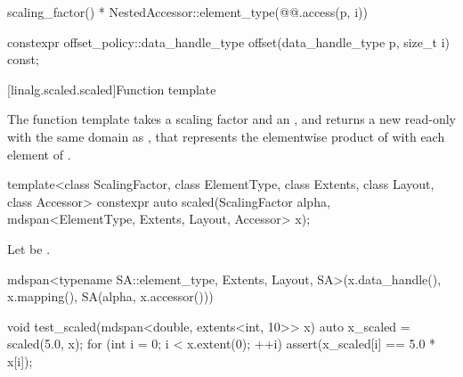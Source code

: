 \begin{itemdescr}
\pnum
\returns
\begin{codeblock}
scaling_factor() * NestedAccessor::element_type(@@.access(p, i))
\end{codeblock}
\end{itemdescr}

%
\begin{itemdecl}
constexpr offset_policy::data_handle_type offset(data_handle_type p, size_t i) const;
\end{itemdecl}

\begin{itemdescr}
\pnum
\returns
{}
\end{itemdescr}

[linalg.scaled.scaled]{Function template }

\pnum
The  function template takes
a scaling factor  and
an  , and
returns a new read-only  with the same domain as ,
that represents the elementwise product of 
with each element of .

%
\begin{itemdecl}
  template<class ScalingFactor,
           class ElementType, class Extents, class Layout, class Accessor>
    constexpr auto scaled(ScalingFactor alpha, mdspan<ElementType, Extents, Layout, Accessor> x);
\end{itemdecl}

\begin{itemdescr}
\pnum
Let  be .

\pnum
\returns
\begin{codeblock}
mdspan<typename SA::element_type, Extents, Layout, SA>(x.data_handle(), x.mapping(),
                                                       SA(alpha, x.accessor()))
\end{codeblock}
\end{itemdescr}

\pnum
\begin{example}
\begin{codeblock}
void test_scaled(mdspan<double, extents<int, 10>> x)
{
  auto x_scaled = scaled(5.0, x);
  for (int i = 0; i < x.extent(0); ++i) {
    assert(x_scaled[i] == 5.0 * x[i]);
  }
}
\end{codeblock}
\end{example}

